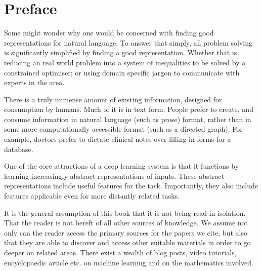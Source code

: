 \documentclass[12pt,parskip]{komatufte}
\begin{document}

\chapter{Preface}\label{sec:introduction}

Some might wonder why one would be concerned with finding good representations for natural language.
To answer that simply, all problem solving is significantly simplified by finding a good representation.
Whether that is reducing an real world problem into a system of inequalities to be solved by a constrained optimiser; or using domain specific jargon to communicate with experts in the area.


There is a truly immense amount of existing information, designed for consumption by humans.
Much of it is in text form.
People prefer to create, and consume information in natural language (such as prose) format,
rather than in some more computationally accessible format (such as a directed graph).
For example, doctors prefer to dictate clinical notes over filling in forms for a database.



One of the core attractions of a deep learning system is that it functions by learning increasingly abstract representations of inputs.
These abstract representations include useful features for the task.
Importantly, they also include features applicable even for more distantly related tasks.



It is the general assumption of this book that it is not being read in isolation.
That the reader is not bereft of all other sources of knowledge.
We assume not only can the reader access the primary sources for the papers we cite,
but also that they are able to discover and access other suitable materials 
in order to go deeper on related areas.
There exist a wealth of blog posts, video tutorials, encyclopaedic article etc. on machine learning and on the mathematics involved.
\end{document}
